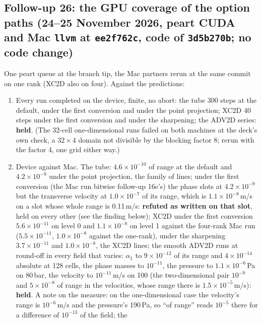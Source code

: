 \documentclass[11pt,a4paper]{article}
\newcommand{\code}[1]{\texttt{\small #1}}
\begin{document}
\subsection{Follow-up 26: the GPU coverage of the option paths (24--25 November 2026, peart CUDA and Mac \code{llvm} at \code{ee2f762c}, code of \code{3d5b270b}; no code change)}
\label{sec:fu26}

One peart queue at the branch tip, the Mac partners rerun at the same
commit on one rank (XC2D also on four).  Against the predictions:
\begin{enumerate}[nosep]
\item Every run completed on the device, finite, no abort: the tube
      300 steps at the default, under the first conversion and under
      the point projection; XC2D 40 steps under the first conversion
      and under the sharpening; the ADV2D series: \textbf{held}.  (The
      32-cell one-dimensional runs failed on both machines at the
      deck's own check, a $32\times4$ domain not divisible by the
      blocking factor 8; rerun with the factor 4, one grid either way.)
\item Device against Mac.  The tube: $4.6\times10^{-10}$ of range at the default
      and $4.2\times10^{-9}$ under the point projection, the family of lines; under
      the first conversion (the Mac run bitwise follow-up 16e's) the
      phase slots at $4.2\times10^{-9}$ but the transverse velocity at
      $1.0\times10^{-7}$ of its range, which is $1.1\times10^{-8}$\,m/s
      on a slot whose whole range is 0.11\,m/s: \textbf{refuted as
      written on that slot}, held on every other (see the finding
      below);
      XC2D under the first conversion $5.6\times10^{-11}$ on level 0
      and $1.1\times10^{-8}$ on level 1 against the four-rank Mac run
      ($5.5\times10^{-11}$, $1.0\times10^{-8}$ against the one-rank),
      under the sharpening $3.7\times10^{-11}$ and $1.0\times10^{-8}$,
      the XC2D lines; the smooth ADV2D runs at round-off in every field
      that varies: $\alpha_1$ to $9\times10^{-12}$ of its range and
      $4\times10^{-14}$ absolute at 128 cells, the phase masses to
      $10^{-11}$, the pressure to $1.1\times10^{-6}$\,Pa on 80\,bar, the
      velocity to $10^{-11}$\,m/s on 100 (the two-dimensional pair
      $10^{-9}$ and $5\times10^{-8}$ of range in the velocities, whose
      range there is $1.5\times10^{-5}$\,m/s): \textbf{held}.  A note on
      the measure: on the one-dimensional case the velocity's range is
      $10^{-6}$\,m/s and the pressure's 190\,Pa, so ``of range'' reads
      $10^{-5}$ there for a difference of $10^{-13}$ of the field; the

\end{enumerate}
\end{document}
